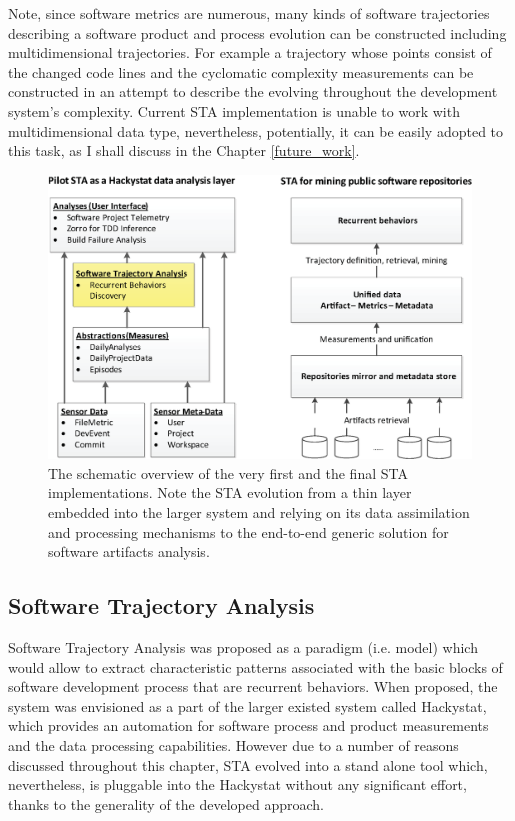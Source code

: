 Note, since software metrics are numerous, many kinds of software trajectories describing a software product and process evolution can be constructed including multidimensional trajectories. For example a trajectory whose points consist of the changed code lines and the cyclomatic complexity measurements can be constructed in an attempt to describe the evolving throughout the development system's complexity. Current STA implementation is unable to work with multidimensional data type, nevertheless, potentially, it can be easily adopted to this task, as I shall discuss in the Chapter \ref{future_work}.

\begin{figure}[t]
   \centering
   \includegraphics[width=150mm]{figures/STA12-schema-draft.eps}
   \caption{The schematic overview of the very first and the final STA implementations. 
   Note the STA evolution from a thin layer embedded into the larger system and relying on its data assimilation and processing 
   mechanisms to the end-to-end generic solution for software artifacts analysis.}
   \label{fig:STA12-schema}
\end{figure}

\subsection{Software Trajectory Analysis}
Software Trajectory Analysis was proposed as a paradigm (i.e. model) which would allow to extract characteristic patterns associated with the basic blocks of software development process that are recurrent behaviors. When proposed, the system was envisioned as a part of the larger existed system called Hackystat, which provides an automation for software process and product measurements and the data processing capabilities. However due to a number of reasons discussed throughout this chapter, STA evolved into a stand alone tool which, nevertheless, is pluggable into the Hackystat without any significant effort, thanks to the generality of the developed approach.

